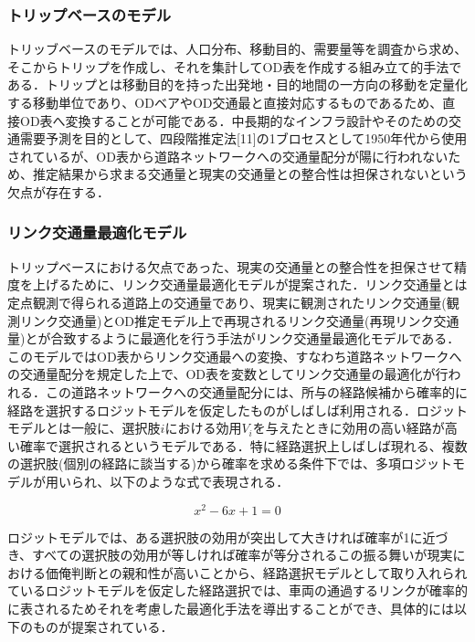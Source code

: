 \subsubsection{トリップベースのモデル}

トリッブベースのモデルでは、人口分布、移動目的、需要量等を調査から求め、そこからトリップを作成し、それを集計してOD表を作成する組み立て的手法である．トリップとは移動目的を持った出発地・目的地間の一方向の移動を定量化する移動単位であり、ODベアやOD交通最と直接対応するものであるため、直接OD表へ変換することが可能である．中長期的なインフラ設計やそのための交通需要予測を目的として、四段階推定法[11]の1ブロセスとして1950年代から使用されているが、OD表から道路ネットワークへの交通量配分が陽に行われないため、推定結果から求まる交通量と現実の交通量との整合性は担保されないという欠点が存在する．

\subsubsection{リンク交通量最適化モデル}

トリップベースにおける欠点であった、現実の交通量との整合性を担保させて精度を上げるために、リンク交通量最適化モデルが提案された．リンク交通量とは定点観測で得られる道路上の交通量であり、現実に観測されたリンク交通量(観測リンク交通量)とOD推定モデル上で再現されるリンク交通量(再現リンク交通量)とが合致するように最適化を行う手法がリンク交通量最適化モデルである．このモデルではOD表からリンク交通最への変換、すなわち道路ネットワークへの交通量配分を規定した上で、OD表を変数としてリンク交通量の最適化が行われる．この道路ネットワークへの交通量配分には、所与の経路候補から確率的に経路を選択するロジットモデルを仮定したものがしばしば利用される．ロジットモデルとは一般に、選択肢$i$における効用$V_i$を与えたときに効用の高い経路が高い確率で選択されるというモデルである．特に経路選択上しばしば現れる、複数の選択肢(個別の経路に談当する)から確率を求める条件下では、多項ロジットモデルが用いられ、以下のような式で表現される．

\begin{equation}
  x^2 - 6x + 1 = 0
\end{equation}

ロジットモデルでは、ある選択肢の効用が突出して大きければ確率が1に近づき、すべての選択肢の効用が等しければ確率が等分されるこの振る舞いが現実における価俺判断との親和性が高いことから、経路選択モデルとして取り入れられているロジットモデルを仮定した経路選択では、車両の通過するリンクが確率的に表されるためそれを考慮した最適化手法を導出することができ、具体的には以下のものが提案されている．

